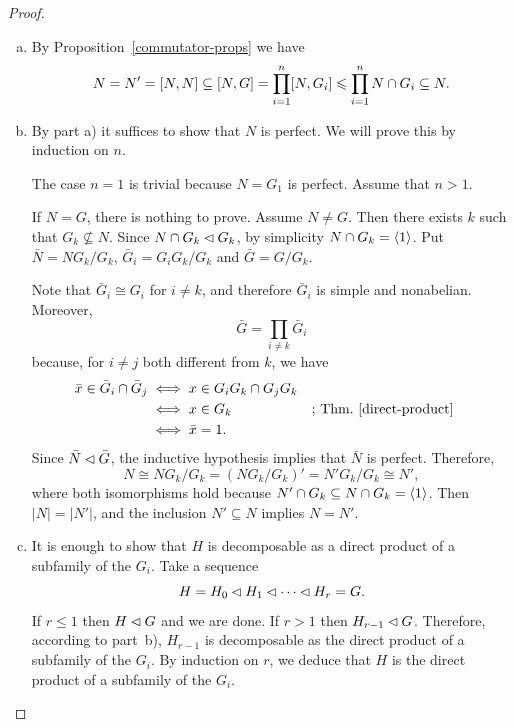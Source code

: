 \begin{proof}\ 
\begin{enumerate}[a),font=\upshape]
    \item By Proposition~\ref{commutator-props} we have
    $$
        N=N'=[N,N]\subseteq[N,G] = \prod_{i=1}^n[N,G_i]\leqslant\prod_{i=1}^nN\cap G_i
            \subseteq N.
    $$
    \item By part a) it suffices to show that $N$ is perfect. We will prove this by induction on $n$.

    The case $n=1$ is trivial because $N=G_1$ is perfect. Assume that $n>1$.
    
    If $N=G$, there is nothing to prove. Assume $N\ne G$. Then there exists $k$ such that $G_k\not\subseteq N$. Since $N\cap G_k\lhd G_k$, by simplicity $N\cap G_k=\langle1\rangle$. Put $\bar N=NG_k/G_k$, $\bar G_i=G_iG_k/G_k$ and $\bar G=G/G_k$.

    Note that $\bar G_i\cong G_i$ for $i\ne k$, and therefore $\bar G_i$ is simple and nonabelian. Moreover,
    $$
        \bar G = \prod_{i\ne k}\bar G_i
    $$
    because, for $i\ne j$ both different from $k$, we have
    \begin{align*}
        \bar x\in \bar G_i\cap \bar G_j &\iff x\in G_iG_k\cap G_jG_k\\
            &\iff x\in G_k   &&\text{; Thm.~\ref{direct-product}}\\
            &\iff \bar x= 1.
    \end{align*}
    Since $\bar N\lhd\bar G$, the inductive hypothesis implies that $\bar N$ is perfect. Therefore,
    $$
        N\cong NG_k/G_k = (NG_k/G_k)' = N'G_k/G_k \cong N',
    $$
    where both isomorphisms hold because $N'\cap G_k\subseteq N\cap G_k=\langle1\rangle$. Then $|N|=|N'|$, and the inclusion $N'\subseteq N$ implies $N=N'$.

    \item It is enough to show that $H$ is decomposable as a direct product of a subfamily of the $G_i$. Take a sequence
    $$
        H=H_0\lhd H_1\lhd\cdots\lhd H_r=G.
    $$
    If $r\le 1$ then $H\lhd G$ and we are done. If $r>1$ then $H_{r-1}\lhd G$. Therefore, according to part~b), $H_{r-1}$ is decomposable as the direct product of a subfamily of the $G_i$. By induction on $r$, we deduce that $H$ is the direct product of a subfamily of the $G_i$.
\end{enumerate}
\end{proof}

